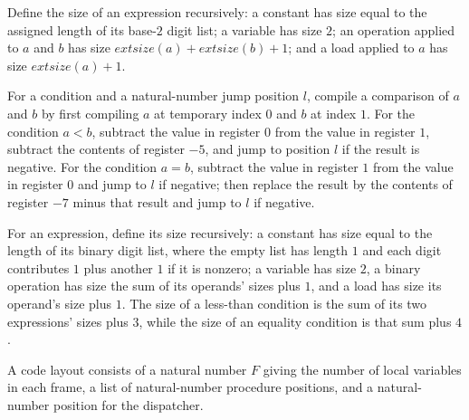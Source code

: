 \begin{definition}
\label{Light.Expr.size}
\leanok
{}
Define the size of an expression recursively: a constant has size equal to the assigned
length of its base-$2$ digit list; a variable has size $2$; an operation applied to $a$
and $b$ has size $	ext{size}(a)+	ext{size}(b)+1$; and a load applied to $a$ has size
$	ext{size}(a)+1$.
\end{definition}

\begin{definition}
\label{Light.Compiler.compileCond}
\leanok
{}
For a condition and a natural-number jump position $l$, compile a comparison of $a$ and
$b$ by first compiling $a$ at temporary index $0$ and $b$ at index $1$. For the
condition $a<b$, subtract the value in register $0$ from the value in register $1$,
subtract the contents of register $-5$, and jump to position $l$ if the result is
negative. For the condition $a=b$, subtract the value in register $1$ from the value in
register $0$ and jump to $l$ if negative; then replace the result by the contents of
register $-7$ minus that result and jump to $l$ if negative.
\end{definition}

\begin{definition}
\label{Light.Cond.size}
\leanok
{}
For an expression, define its size recursively: a constant has size equal to the length
of its binary digit list, where the empty list has length $1$ and each digit contributes
$1$ plus another $1$ if it is nonzero; a variable has size $2$, a binary operation has
size the sum of its operands’ sizes plus $1$, and a load has size its operand’s size
plus $1$. The size of a less-than condition is the sum of its two expressions’ sizes
plus $3$, while the size of an equality condition is that sum plus $4$.
\end{definition}

\begin{definition}
\label{Light.Compiler.CodeLayout}
\leanok
A code layout consists of a natural number $F$ giving the number of local variables in
each frame, a list of natural-number procedure positions, and a natural-number position
for the dispatcher.
\end{definition}

